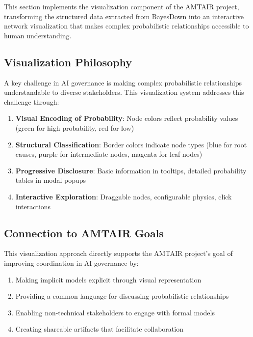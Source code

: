 \documentclass[
  11pt,
  letterpaper,
]{book}
\providecommand{\tightlist}{%
  \setlength{\itemsep}{0pt}\setlength{\parskip}{0pt}}
\begin{document}
This section implements the visualization component of the AMTAIR
project, transforming the structured data extracted from BayesDown into
an interactive network visualization that makes complex probabilistic
relationships accessible to human understanding.

\subsection{Visualization Philosophy}\label{visualization-philosophy}

A key challenge in AI governance is making complex probabilistic
relationships understandable to diverse stakeholders. This visualization
system addresses this challenge through:

\begin{enumerate}
\def\labelenumi{\arabic{enumi}.}
\tightlist
\item
  \textbf{Visual Encoding of Probability}: Node colors reflect
  probability values (green for high probability, red for low)
\item
  \textbf{Structural Classification}: Border colors indicate node types
  (blue for root causes, purple for intermediate nodes, magenta for leaf
  nodes)
\item
  \textbf{Progressive Disclosure}: Basic information in tooltips,
  detailed probability tables in modal popups
\item
  \textbf{Interactive Exploration}: Draggable nodes, configurable
  physics, click interactions
\end{enumerate}

\subsection{Connection to AMTAIR
Goals}\label{connection-to-amtair-goals}

This visualization approach directly supports the AMTAIR project's goal
of improving coordination in AI governance by:

\begin{enumerate}
\def\labelenumi{\arabic{enumi}.}
\tightlist
\item
  Making implicit models explicit through visual representation
\item
  Providing a common language for discussing probabilistic relationships
\item
  Enabling non-technical stakeholders to engage with formal models
\item
  Creating shareable artifacts that facilitate collaboration
\end{enumerate}
\end{document}
